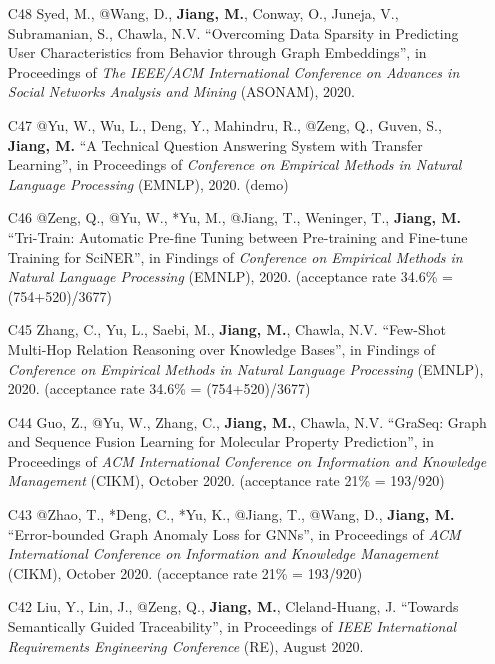 \documentclass[10pt]{article}
\newenvironment{myindentpar}[1]%
{\begin{list}{}%
         {\setlength{\leftmargin}{#1}}%
         \item[]%
}
{\end{list}}
\newcounter{list}
\begin{document}
\begin{myindentpar}{0.00cm}
\begin{enumerate}[leftmargin=.5cm]
\item[C48] Syed, M., @Wang, D., \textbf{Jiang, M.}, Conway, O., Juneja, V., Subramanian, S., Chawla, N.V. ``Overcoming Data Sparsity in Predicting User Characteristics from Behavior through Graph Embeddings'', in Proceedings of \textit{The IEEE/ACM International Conference on Advances in Social Networks Analysis and Mining} (ASONAM), 2020.

\item[C47] @Yu, W., Wu, L., Deng, Y., Mahindru, R., @Zeng, Q., Guven, S., \textbf{Jiang, M.} ``A Technical Question Answering System with Transfer Learning'', in Proceedings of \textit{Conference on Empirical Methods in Natural Language Processing} (EMNLP), 2020. (demo)
		
\item[C46] @Zeng, Q., @Yu, W., *Yu, M., @Jiang, T., Weninger, T., \textbf{Jiang, M.} ``Tri-Train: Automatic Pre-fine Tuning between Pre-training and Fine-tune Training for SciNER'', in Findings of \textit{Conference on Empirical Methods in Natural Language Processing} (EMNLP), 2020. (acceptance rate 34.6\% = (754+520)/3677)

\item[C45] Zhang, C., Yu, L., Saebi, M., \textbf{Jiang, M.}, Chawla, N.V. ``Few-Shot Multi-Hop Relation Reasoning over Knowledge Bases'', in Findings of \textit{Conference on Empirical Methods in Natural Language Processing} (EMNLP), 2020. (acceptance rate 34.6\% = (754+520)/3677)

\item[C44] Guo, Z., @Yu, W., Zhang, C., \textbf{Jiang, M.}, Chawla, N.V. ``GraSeq: Graph and Sequence Fusion Learning for Molecular Property Prediction'', in Proceedings of \textit{ACM International Conference on Information and Knowledge Management} (CIKM), October 2020. (acceptance rate 21\% = 193/920)
		
\item[C43] @Zhao, T., *Deng, C., *Yu, K., @Jiang, T., @Wang, D., \textbf{Jiang, M.} ``Error-bounded Graph Anomaly Loss for GNNs'', in Proceedings of \textit{ACM International Conference on Information and Knowledge Management} (CIKM), October 2020. (acceptance rate 21\% = 193/920)

\item[C42] Liu, Y., Lin, J., @Zeng, Q., \textbf{Jiang, M.}, Cleland-Huang, J. ``Towards Semantically Guided Traceability'', in Proceedings of \textit{IEEE International Requirements Engineering Conference} (RE), August 2020.	


\end{enumerate}
\end{myindentpar}
\end{document}
